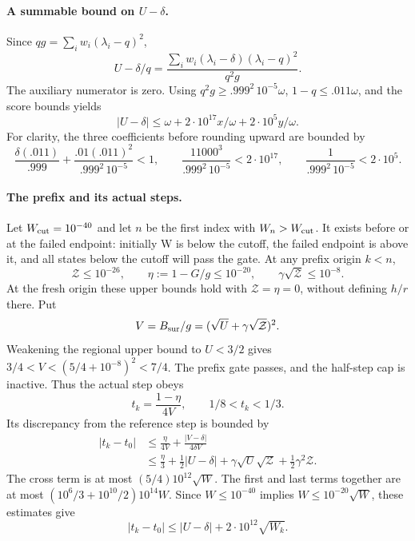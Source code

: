 \paragraph{A summable bound on $U-\delta$.}
Since $qg=\sum_iw_i(\lambda_i-q)^2$,
\[
 U-\delta/q=
 \frac{\sum_iw_i(\lambda_i-\delta)(\lambda_i-q)^2}{q^2g}.
\]
The auxiliary numerator is zero. Using $q^2g\ge.999^2\,10^{-5}\omega$,
$1-q\le.011\omega$, and the score bounds yields
\begin{equation}\label{eq:bsur-u-error}
 |U-\delta|\le\omega+2\cdot10^{17}x/\omega+2\cdot10^5y/\omega.
\end{equation}
For clarity, the three coefficients before rounding upward are bounded by
\[
 \frac{\delta(.011)}{.999}
 +\frac{.01(.011)^2}{.999^2\,10^{-5}}<1,\qquad
 \frac{11000^3}{.999^2\,10^{-5}}<2\cdot10^{17},\qquad
 \frac1{.999^2\,10^{-5}}<2\cdot10^5.
\]

\paragraph{The prefix and its actual steps.}
Let $W_{\rm cut}=10^{-40}$ and let $n$ be the first index with
$W_n>W_{\rm cut}$. It exists before or at the failed endpoint: initially W is
below the cutoff, the failed endpoint is above it, and all states below the
cutoff will pass the gate. At any prefix origin $k<n$,
\[
 \mathcal Z\le10^{-26},\qquad
 \eta:=1-G/g\le10^{-20},\qquad
 \gamma\sqrt{\mathcal Z}\le10^{-8}.
\]
At the fresh origin these upper bounds hold with $\mathcal Z=\eta=0$, without
defining $h/r$ there. Put
\[
 V=B_{\rm sur}/g=(\sqrt U+\gamma\sqrt{\mathcal Z})^2.
\]
Weakening the regional upper bound to $U<3/2$ gives
$3/4<V<(5/4+10^{-8})^2<7/4$. The prefix gate passes, and the half-step cap is
inactive. Thus the actual step obeys
\begin{equation}\label{eq:bsur-prefix-step}
 t_k=\frac{1-\eta}{4V},\qquad 1/8<t_k<1/3.
\end{equation}
Its discrepancy from the reference step is bounded by
\begin{align*}
 |t_k-t_0|
 &\le\frac{\eta}{4V}+\frac{|V-\delta|}{4\delta V}\\
 &\le\frac\eta3+\frac12|U-\delta|
       +\gamma\sqrt U\sqrt{\mathcal Z}
       +\frac12\gamma^2\mathcal Z.
\end{align*}
The cross term is at most $(5/4)10^{12}\sqrt W$. The first and last terms
together are at most $(10^6/3+10^{10}/2)10^{14}W$.
Since $W\le10^{-40}$ implies $W\le10^{-20}\sqrt W$, these estimates give
\begin{equation}\label{eq:bsur-step-error}
 |t_k-t_0|\le |U-\delta|+2\cdot10^{12}\sqrt{W_k}.
\end{equation}

